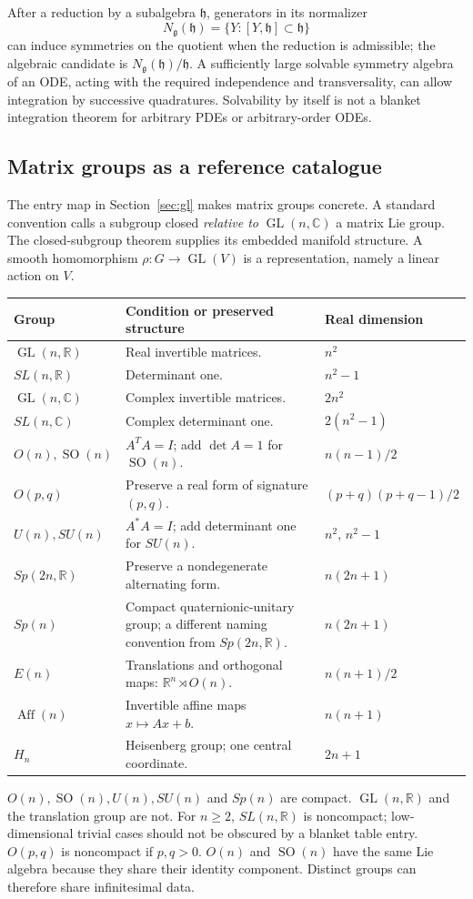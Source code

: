 \documentclass[11pt,a4paper]{article}
\numberwithin{equation}{section}
\theoremstyle{definition}
\theoremstyle{plain}
\theoremstyle{remark}
\newcommand{\R}{\mathbb R}
\newcommand{\C}{\mathbb C}
\newcommand{\g}{\mathfrak g}
\newcommand{\GL}{\operatorname{GL}}
\newcommand{\SO}{\operatorname{SO}}
\begin{document}
After a reduction by a subalgebra $\mathfrak h$, generators in its normalizer
\[
N_\g(\mathfrak h)=\{Y:[Y,\mathfrak h]\subset\mathfrak h\}
\]
can induce symmetries on the quotient when the reduction is admissible; the algebraic candidate is $N_\g(\mathfrak h)/\mathfrak h$. A sufficiently large solvable symmetry algebra of an ODE, acting with the required independence and transversality, can allow integration by successive quadratures. Solvability by itself is not a blanket integration theorem for arbitrary PDEs or arbitrary-order ODEs.

\subsection{Matrix groups as a reference catalogue}\label{sec:catalogue}
The entry map in Section~\ref{sec:gl} makes matrix groups concrete. A standard convention calls a subgroup closed \emph{relative to} $\GL(n,\C)$ a matrix Lie group. The closed-subgroup theorem supplies its embedded manifold structure. A smooth homomorphism $\rho:G\to\GL(V)$ is a representation, namely a linear action on $V$.

\begin{center}\small\renewcommand{\arraystretch}{1.25}
\begin{tabularx}{\linewidth}{@{}p{.25\linewidth}Y p{.22\linewidth}@{}}
\toprule Group & Condition or preserved structure & Real dimension \\
\midrule
$\GL(n,\R)$ & Real invertible matrices. & $n^2$\\
$SL(n,\R)$ & Determinant one. & $n^2-1$\\
$\GL(n,\C)$ & Complex invertible matrices. & $2n^2$\\
$SL(n,\C)$ & Complex determinant one. & $2(n^2-1)$\\
$O(n),\SO(n)$ & $A^TA=I$; add $\det A=1$ for $\SO(n)$. & $n(n-1)/2$\\
$O(p,q)$ & Preserve a real form of signature $(p,q)$. & $(p+q)(p+q-1)/2$\\
$U(n),SU(n)$ & $A^*A=I$; add determinant one for $SU(n)$. & $n^2$, $n^2-1$\\
$Sp(2n,\R)$ & Preserve a nondegenerate alternating form. & $n(2n+1)$\\
$Sp(n)$ & Compact quaternionic-unitary group; a different naming convention from $Sp(2n,\R)$. & $n(2n+1)$\\
$E(n)$ & Translations and orthogonal maps: $\R^n\rtimes O(n)$. & $n(n+1)/2$\\
$\operatorname{Aff}(n)$ & Invertible affine maps $x\mapsto Ax+b$. & $n(n+1)$\\
$H_n$ & Heisenberg group; one central coordinate. & $2n+1$\\
\bottomrule
\end{tabularx}
\end{center}
$O(n),\SO(n),U(n),SU(n)$ and $Sp(n)$ are compact. $\GL(n,\R)$ and the translation group are not. For $n\ge2$, $SL(n,\R)$ is noncompact; low-dimensional trivial cases should not be obscured by a blanket table entry. $O(p,q)$ is noncompact if $p,q>0$. $O(n)$ and $\SO(n)$ have the same Lie algebra because they share their identity component. Distinct groups can therefore share infinitesimal data.
\end{document}
